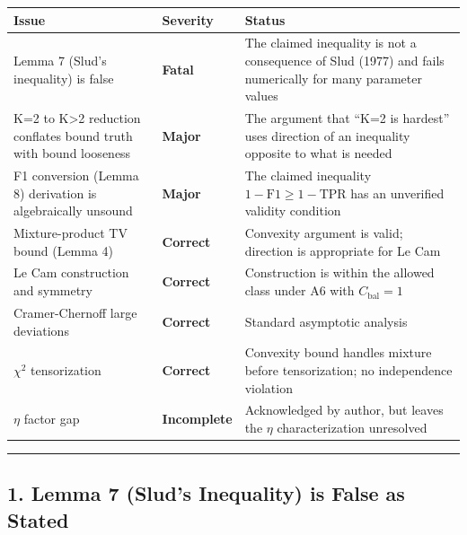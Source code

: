 \documentclass[
  12pt,
]{article}
\begin{document}
\begin{longtable}[]{@{}
  >{\raggedright\arraybackslash}p{}
  >{\raggedright\arraybackslash}p{}
  >{\raggedright\arraybackslash}p{}@{}}
\toprule\noalign{}
\begin{minipage}[b]{\linewidth}\raggedright
Issue
\end{minipage} & \begin{minipage}[b]{\linewidth}\raggedright
Severity
\end{minipage} & \begin{minipage}[b]{\linewidth}\raggedright
Status
\end{minipage} \\
\midrule\noalign{}
\endhead
\bottomrule\noalign{}
\endlastfoot
Lemma 7 (Slud's inequality) is false & \textbf{Fatal} & The claimed
inequality is not a consequence of Slud (1977) and fails numerically for
many parameter values \\
K=2 to K\textgreater2 reduction conflates bound truth with bound
looseness & \textbf{Major} & The argument that ``K=2 is hardest'' uses
direction of an inequality opposite to what is needed \\
F1 conversion (Lemma 8) derivation is algebraically unsound &
\textbf{Major} & The claimed inequality
\(1-\text{F1} \geq 1-\text{TPR}\) has an unverified validity
condition \\
Mixture-product TV bound (Lemma 4) & \textbf{Correct} & Convexity
argument is valid; direction is appropriate for Le Cam \\
Le Cam construction and symmetry & \textbf{Correct} & Construction is
within the allowed class under A6 with \(C_\text{bal}=1\) \\
Cramer-Chernoff large deviations & \textbf{Correct} & Standard
asymptotic analysis \\
\(\chi^2\) tensorization & \textbf{Correct} & Convexity bound handles
mixture before tensorization; no independence violation \\
\(\eta\) factor gap & \textbf{Incomplete} & Acknowledged by author, but
leaves the \(\eta\) characterization unresolved \\
\end{longtable}

\begin{center}\rule{0.5\linewidth}{0.5pt}\end{center}

\subsection{1. Lemma 7 (Slud's Inequality) is False as
Stated}\label{lemma-7-sluds-inequality-is-false-as-stated}
\end{document}
